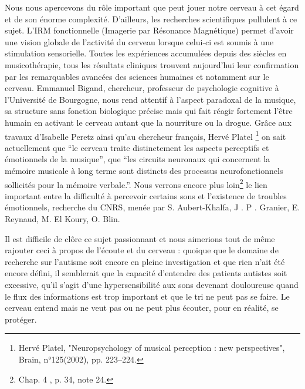 Nous nous apercevons du rôle important que peut jouer notre cerveau à cet égard et de son énorme complexité. 
D'ailleurs, les recherches scientifiques pullulent à ce sujet. L'IRM fonctionnelle 
(Imagerie par Résonance Magnétique)  permet d'avoir une vision globale de 
l'activité du cerveau lorsque celui-ci est soumis à une stimulation 
sensorielle. Toutes les expériences accumulées depuis des siècles en musicothérapie,
tous les résultats cliniques trouvent aujourd'hui leur confirmation par les remarquables
avancées des sciences humaines et notamment sur le cerveau. 
Emmanuel Bigand,  chercheur, professeur de psychologie cognitive à l'Université 
de Bourgogne, nous rend attentif à  l'aspect paradoxal de la musique, 
sa structure sans fonction biologique précise mais qui fait réagir 
fortement l'être humain en activant  le cerveau autant que la nourriture 
ou la drogue.\autocite[Voir ch. 3 p. 35, "Vous avez l'oreille musicale"]{bigand:cerveau}
Grâce aux travaux d'Isabelle Peretz%
\autocite[<<\,Les agnosies auditives\,>>, pp. 205--216]{seron.baron.ea:neuropsychologie}
ainsi qu'au chercheur français, Hervé Platel%
\footnote{Hervé Platel, "Neuropsychology of musical perception : new perspectives", 
Brain, n°125(2002), pp. 223--224.} 
on sait actuellement que \enquote{le cerveau traite distinctement les aspects perceptifs et émotionnels de la musique},
que \enquote{les circuits neuronaux qui concernent la mémoire musicale à long terme 
sont distincts des processus neurofonctionnels sollicités pour la mémoire verbale.}.
Nous verrons encore plus loin\footnote{Chap. 4 , p. 34, note 24.} 
le lien important entre la difficulté à percevoir certains sons et l'existence 
de troubles émotionnels, recherche du CNRS, 
menée par S. Aubert-Khalfa, J . P . Granier, E. Reynaud, M. El Koury, O. Blin.

Il est difficile de clôre ce sujet passionnant et nous aimerions tout de même rajouter ceci à propos de l'écoute et du cerveau : quoique que le domaine de recherche sur l'autisme soit encore en pleine investigation et que rien n'ait été encore défini, il semblerait que la capacité d'entendre des patients autistes soit excessive, qu'il s'agit d'une hypersensibilité aux sons devenant douloureuse quand  le flux des informations est trop important et que le tri ne peut pas se faire. Le cerveau entend mais ne veut pas ou ne peut plus  écouter, pour en réalité, se protéger.

